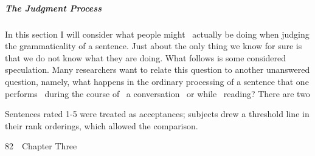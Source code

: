 \subparagraph[The Judgment Process]{The Judgment Process}
\begin{styleStandard}
In this section I will consider what people might \ actually be doing when judging the grammaticality of a sentence. Just about the only thing we know for sure is that we do not know what they are doing. What follows is some considered speculation. Many researchers want to relate this question to another unanswered question, namely, what happens in the ordinary processing of a sentence that one performs \ during the course of \ a conversation \ or while \ reading? There are two
\end{styleStandard}


\setcounter{listWWNumxlviileveli}{20}
\begin{listWWNumxlviileveli}
\item 
\begin{styleStandard}
Sentences rated 1-5 were treated as acceptances; subjects drew a threshold line in their rank orderings, which allowed the comparison.
\end{styleStandard}


\end{listWWNumxlviileveli}
\clearpage\setcounter{page}{1}\begin{styleStandard}
82\ \ Chapter Three
\end{styleStandard}


